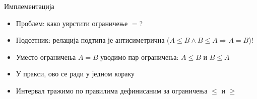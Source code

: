 \documentclass[xcolor=table]{beamer}
\begin{document}
\begin{frame}[allowframebreaks]{Имплементација}
        \framebreak
        
        \begin{itemize}
            \item Проблем: како уврстити ограничење \begin{math}=\end{math}?
            \item Подсетник: релација подтипа је антисиметрична (\begin{math}A \leq B \wedge B \leq A \Rightarrow A = B\end{math})!
            \item Уместо ограничења \begin{math}A = B\end{math} уводимо пар ограничења: \begin{math}A \leq B\end{math} и \begin{math}B \leq A\end{math}
            \item У пракси, ово се ради у једном кораку
            \item Интервал тражимо по правилима дефинисаним за ограничења \begin{math}\leq\end{math} и \begin{math}\geq\end{math}
        \end{itemize}
    \end{frame}
    
\end{document}
